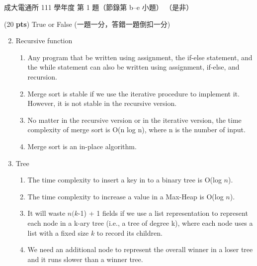 \begin{pastexam}[label={px:ncku-111-cce-ds-01}]{成大電通所 111 學年度 第 1 題（節錄第 b--e 小題）}
（是非）

(20 \textbf{pts}) True or False (一題一分，答錯一題倒扣一分)
\begin{enumerate}[label=\alph*.]
\setcounter{enumi}{1}
\item Recursive function
\begin{enumerate}[label=\Alph*)]
\item Any program that be written using assignment, the if-else statement, and the while
statement can also be written using assignment, if-else, and recursion.
\item Merge sort is stable if we use the iterative procedure to implement it. However, it is not
stable in the recursive version.
\item No matter in the recursive version or in the iterative version, the time complexity of
merge sort is O(n log n), where n is the number of input.
\item Merge sort is an in-place algorithm.
\end{enumerate}

\item Tree
\begin{enumerate}[label=\Alph*)]
\item The time complexity to insert a key in to a binary tree is O(log $n$).
\item The time complexity to increase a value in a Max-Heap is O(log $n$).
\item It will waste $n(k$-1) + 1 fields if we use a list representation to represent each node in
a k-ary tree (i.e., a tree of degree k), where each node uses a list with a fixed size $k$ to
record its children.
\item We need an additional node to represent the overall winner in a loser tree and it runs
slower than a winner tree.
\end{enumerate}


\end{enumerate}
\end{pastexam}
